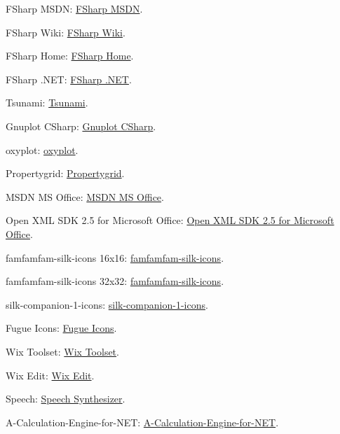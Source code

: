 	
	
	FSharp MSDN: \href{http://msdn.microsoft.com/en-US/library/vstudio/ee241127(v=vs.120).aspx}{FSharp MSDN}.
	
	FSharp Wiki: \href{http://en.wikipedia.org/wiki/F_Sharp_(programming_language)}{FSharp Wiki}.
	
	FSharp Home: \href{http://fsharp.org/}{FSharp Home}.
	
	FSharp .NET: \href{http://fsharpforfunandprofit.com/posts/completeness-seamless-dotnet-interop/}{FSharp .NET}.
	
	Tsunami: \href{http://tsunami.io/index.html}{Tsunami}.
	
	Gnuplot CSharp: \href{https://github.com/AwokeKnowing/GnuplotCSharp}{Gnuplot CSharp}.
	
	oxyplot: \href{http://oxyplot.codeplex.com/}{oxyplot}.
	
	Propertygrid:  \href{http://www.codeproject.com/Articles/27326/Load-and-Save-Data-Using-PropertyGrid?q=Load+and+Save+Data+Using+PropertyGrid}{Propertygrid}.
	
	
	MSDN MS Office: \href{http://msdn.microsoft.com/en-us/library/office/}{MSDN MS Office}.
	
	Open XML SDK 2.5 for Microsoft Office: \href{http://www.microsoft.com/en-us/download/details.aspx?id=30425}{Open XML SDK 2.5 for Microsoft Office}.
	
	famfamfam-silk-icons 16x16: \href{http://www.famfamfam.com/lab/icons/silk/}{famfamfam-silk-icons}.
	
	famfamfam-silk-icons 32x32: \href{http://www.iconarchive.com/show/farm-fresh-icons-by-fatcow.html}{famfamfam-silk-icons}.
	
	
	
	silk-companion-1-icons: \href{http://damieng.com/creative/icons/silk-companion-1-icons}{silk-companion-1-icons}.
	
	Fugue Icons: \href{http://p.yusukekamiyamane.com/}{Fugue Icons}.
	
	Wix Toolset: \href{http://wixtoolset.org/}{Wix Toolset}.
	
	Wix Edit: \href{http://wixedit.sourceforge.net/}{Wix Edit}.
	
	Speech: \href{http://www.codeproject.com/Articles/28725/A-Very-Easy-Introduction-to-Microsoft-NET-Speech-S}{Speech Synthesizer}.
	
	
	A-Calculation-Engine-for-NET: \href{http://www.codeproject.com/Articles/246374/A-Calculation-Engine-for-NET}{A-Calculation-Engine-for-NET}. 
	
